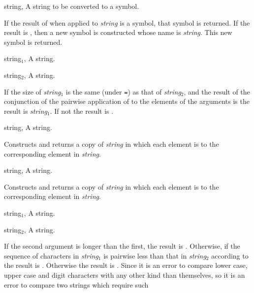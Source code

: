 \begin{optDefinition}
\begin{specargs}
    \item[string, \classref{string}] A string to be converted to a symbol.
\end{specargs}
%
\result%
If the result of  when applied to {\em string\/}
is a symbol, that symbol is returned.  If the result is \nil{}, then
a new symbol is constructed whose name is {\em string}.  This new
symbol is returned.
%
%
\begin{specargs}
    \item[string$_1$, \classref{string}] A string.
    \item[string$_2$, \classref{string}] A string.
\end{specargs}
%
\result%
If the size of {\em string$_1$} is the same (under {\tt =}) as that of {\em
    string$_2$}, and the result of the conjunction of the pairwise application
of  to the elements of the arguments is \true{}
the result is {\em string$_1$}.  If not the result is \nil{}.
%
%
\begin{specargs}
    \item[string, \classref{string}] A string.
\end{specargs}
%
\result%
Constructs and returns a copy of {\em string\/} in which each element
is  to the corresponding element in {\em string}.
%
%
\begin{specargs}
    \item[string, \classref{string}] A string.
\end{specargs}
%
\result%
Constructs and returns a copy of {\em string\/} in which each element
is  to the corresponding element in {\em string}.
%
%
\begin{specargs}
    \item[string$_1$, \classref{string}] A string.
    \item[string$_2$, \classref{string}] A string.
\end{specargs}
%
\result%
If the second argument is longer than the first, the result is \nil{}.
Otherwise, if the sequence of characters in {\em string$_1$} is pairwise less
than that in {\em string$_2$} according to  the
result is \true.  Otherwise the result is \nil{}.  Since it is an error to
compare lower case, upper case and digit characters with any other kind than
themselves, so it is an error to compare two strings which require such

\end{optDefinition}
